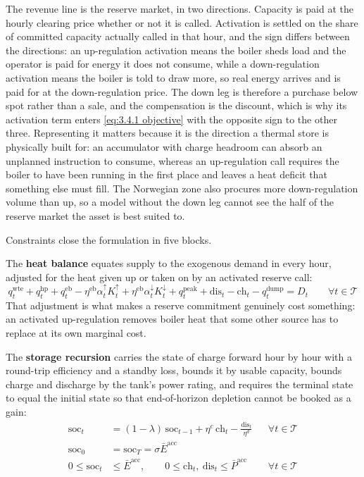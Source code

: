 The revenue line is the reserve market, in two directions. Capacity is paid at the hourly clearing price whether or not it is called. Activation is settled on the share of committed capacity actually called in that hour, and the sign differs between the directions: an up-regulation activation means the boiler sheds load and the operator is paid for energy it does not consume, while a down-regulation activation means the boiler is told to draw more, so real energy arrives and is paid for at the down-regulation price. The down leg is therefore a purchase below spot rather than a sale, and the compensation is the discount, which is why its activation term enters \autoref{eq:3.4.1 objective} with the opposite sign to the other three. Representing it matters because it is the direction a thermal store is physically built for: an accumulator with charge headroom can absorb an unplanned instruction to consume, whereas an up-regulation call requires the boiler to have been running in the first place and leaves a heat deficit that something else must fill. The Norwegian zone also procures more down-regulation volume than up, so a model without the down leg cannot see the half of the reserve market the asset is best suited to.

Constraints close the formulation in five blocks.

The \textbf{heat balance} equates supply to the exogenous demand in every hour, adjusted for the heat given up or taken on by an activated reserve call:
\begin{equation}
    q^{\text{wte}}_t + q^{\text{hp}}_t + q^{\text{eb}}_t - \eta^{\text{eb}} \alpha^{\uparrow}_t K^{\uparrow}_t + \eta^{\text{eb}} \alpha^{\downarrow}_t K^{\downarrow}_t + q^{\text{peak}}_t + \text{dis}_t - \text{ch}_t - q^{\text{dump}}_t = D_t \qquad \forall t \in \mathcal{T} \label{eq:3.4.1 heat balance}
\end{equation}
That adjustment is what makes a reserve commitment genuinely cost something: an activated up-regulation removes boiler heat that some other source has to replace at its own marginal cost.

The \textbf{storage recursion} carries the state of charge forward hour by hour with a round-trip efficiency and a standby loss, bounds it by usable capacity, bounds charge and discharge by the tank's power rating, and requires the terminal state to equal the initial state so that end-of-horizon depletion cannot be booked as a gain:
\begin{align}
    \text{soc}_t &= (1 - \lambda)\,\text{soc}_{t-1} + \eta^{c}\,\text{ch}_t - \frac{\text{dis}_t}{\eta^{d}} && \forall t \in \mathcal{T} \label{eq:3.4.1 soc} \\
    \text{soc}_0 &= \text{soc}_T = \sigma \bar{E}^{\text{acc}} \label{eq:3.4.1 soc terminal} \\
    0 \leq \text{soc}_t &\leq \bar{E}^{\text{acc}}, \qquad 0 \leq \text{ch}_t,\ \text{dis}_t \leq \bar{P}^{\text{acc}} && \forall t \in \mathcal{T} \label{eq:3.4.1 soc bounds}
\end{align}

